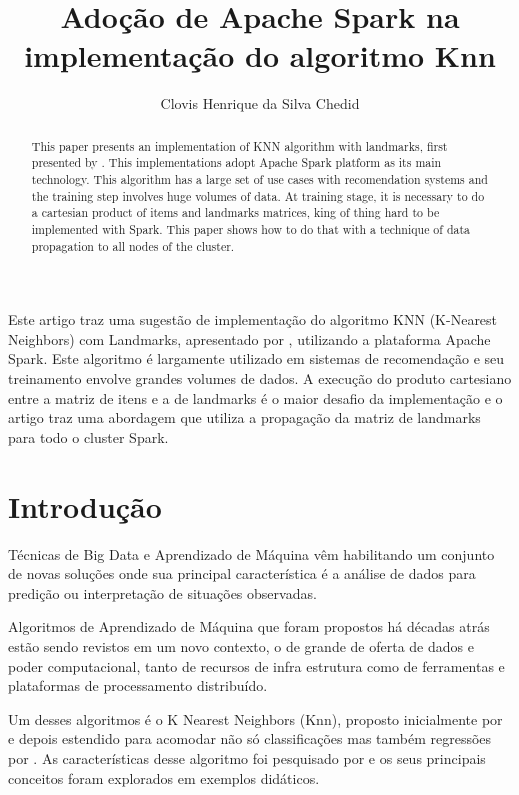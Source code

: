 \documentclass[12pt]{article}
\title{Adoção de Apache Spark na implementação do algoritmo Knn}
\author{Clovis Henrique da Silva Chedid }
\begin{document}
 

\maketitle

\begin{abstract}
  This paper presents an implementation of KNN algorithm with landmarks, first presented by \cite{lima:18}. This implementations adopt Apache Spark platform as its main technology. This algorithm has a large set of use cases with recomendation systems and the training step involves huge volumes of data. At training stage, it is necessary to do a cartesian product of items and landmarks matrices, king of thing hard to be implemented with Spark. This paper shows how to do that with a technique of data propagation to all nodes of the cluster.
\end{abstract}
     
\begin{resumo} 
  Este artigo traz uma sugestão de implementação do algoritmo KNN (K-Nearest Neighbors) com Landmarks, apresentado por \cite{lima:18}, utilizando a plataforma Apache Spark. Este algoritmo é largamente utilizado em sistemas de recomendação e seu treinamento envolve grandes volumes de dados. A execução do produto cartesiano entre a matriz de itens e a de landmarks é o maior desafio da implementação e o artigo traz uma abordagem que utiliza a propagação da matriz de landmarks para todo o cluster Spark.
\end{resumo}

\pagebreak
\section{Introdução}\label{intro}

Técnicas de Big Data e Aprendizado de Máquina vêm habilitando um conjunto de novas soluções onde sua principal característica é a análise de dados para predição ou interpretação de situações observadas.

Algoritmos de Aprendizado de Máquina que foram propostos há décadas atrás estão sendo revistos em um novo contexto, o de grande de oferta de dados e poder computacional, tanto de recursos de infra estrutura como de ferramentas e plataformas de processamento distribuído.

Um desses algoritmos é o K Nearest Neighbors (Knn), proposto inicialmente por \cite{cover_hart:67} e depois estendido para acomodar não só classificações mas também regressões por \cite{stone:77}. As características desse algoritmo foi pesquisado por \cite{jingwen:18} e os seus principais conceitos foram explorados em exemplos didáticos.
\end{document}
